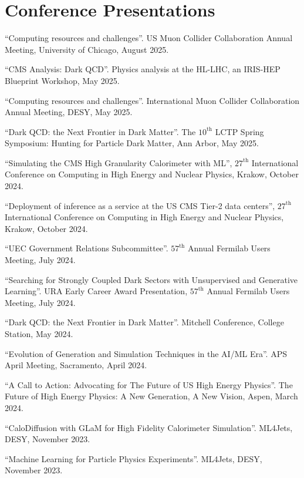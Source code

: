 \section{Conference Presentations}
\begin{nbdescription}[leftmargin=12pt,font=\normalfont,labelsep=0em]
\item ``Computing resources and challenges''. US Muon Collider Collaboration Annual Meeting, University of Chicago, August 2025.
\item ``CMS Analysis: Dark QCD''. Physics analysis at the HL-LHC, an IRIS-HEP Blueprint Workshop, May 2025.
\item ``Computing resources and challenges''. International Muon Collider Collaboration Annual Meeting, DESY, May 2025.
\item ``Dark QCD: the Next Frontier in Dark Matter''. The $10^{\text{th}}$ LCTP Spring Symposium: Hunting for Particle Dark Matter, Ann Arbor, May 2025.
\item ``Simulating the CMS High Granularity Calorimeter with ML'', $27^{\text{th}}$ International Conference on Computing in High Energy and Nuclear Physics, Krakow, October 2024.
\item ``Deployment of inference as a service at the US CMS Tier-2 data centers'', $27^{\text{th}}$ International Conference on Computing in High Energy and Nuclear Physics, Krakow, October 2024.
\item ``UEC Government Relations Subcommittee''. $57^{\text{th}}$ Annual Fermilab Users Meeting, July 2024.
\item ``Searching for Strongly Coupled Dark Sectors with Unsupervised and Generative Learning''. URA Early Career Award Presentation, $57^{\text{th}}$ Annual Fermilab Users Meeting, July 2024.
\item ``Dark QCD: the Next Frontier in Dark Matter''. Mitchell Conference, College Station, May 2024.
\item ``Evolution of Generation and Simulation Techniques in the AI/ML Era''. APS April Meeting, Sacramento, April 2024.
\item ``A Call to Action: Advocating for The Future of US High Energy Physics''. The Future of High Energy Physics: A New Generation, A New Vision, Aspen, March 2024.
\item ``CaloDiffusion with GLaM for High Fidelity Calorimeter Simulation''. ML4Jets, DESY, November 2023.
\item ``Machine Learning for Particle Physics Experiments''. ML4Jets, DESY, November 2023.

\end{nbdescription}
